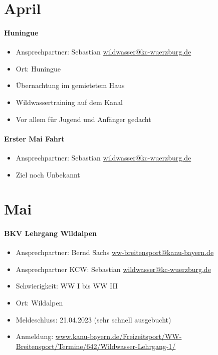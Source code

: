 \documentclass[12pt, a4paper]{report}
\begin{document}
\section*{April}\paragraph{Huningue}
\begin{itemize}
    \item Ansprechpartner: Sebastian \href{mailto:wildwasser@kc-wuerzburg.de}{wildwasser@kc-wuerzburg.de}
    \item Ort: Huningue
    \item Übernachtung im gemietetem Haus
    \item Wildwassertraining auf dem Kanal
    \item Vor allem für Jugend und Anfänger gedacht
\end{itemize}

\paragraph{Erster Mai Fahrt}
\begin{itemize}
    \item Ansprechpartner: Sebastian \href{mailto:wildwasser@kc-wuerzburg.de}{wildwasser@kc-wuerzburg.de}
    \item Ziel noch Unbekannt
\end{itemize}

\section*{Mai}\paragraph{BKV Lehrgang Wildalpen}
\begin{itemize}
    \item Ansprechpartner: Bernd Sachs \href{mailto:ww-breitensport@kanu-bayern.de}{ww-breitensport@kanu-bayern.de}
    \item Ansprechpartner KCW: Sebastian \href{mailto:wildwasser@kc-wuerzburg.de}{wildwasser@kc-wuerzburg.de}
    \item Schwierigkeit: WW I bis WW III
    \item Ort: Wildalpen
    \item Meldeschluss: 21.04.2023 (sehr schnell ausgebucht)
    \item Anmeldung: \url{www.kanu-bayern.de/Freizeitsport/WW-Breitensport/Termine/642/Wildwasser-Lehrgang-1/}
\end{itemize}
\end{document}

